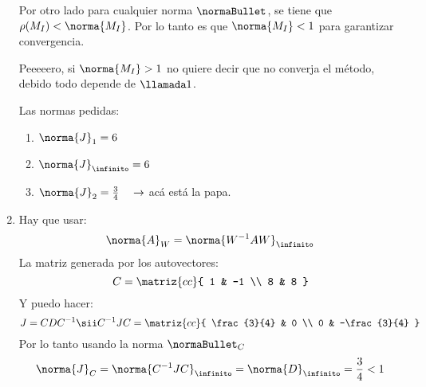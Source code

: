 \begin{enumerate}[label=(\alph*)]
{          Por otro lado para cualquier norma $\normaBullet$, se tiene que $\rho(M_I) < \norma{M_I}$. Por lo tanto
          es \textit{} que $\norma{M_I} < 1$ para garantizar convergencia.

          Peeeeero, si $\norma{M_I} > 1$ no quiere decir que no converja el método, debido todo depende de $\llamada1$.
        }

        Las normas pedidas:
        \begin{enumerate}[label=(\blue{\faIcon{ruler}})]
          \item $\norma{J}_1 = 6$
          \item $\norma{J}_\infinito = 6$
          \item $\norma{J}_2 = \frac{3}{4}\quad \to $ acá está la papa.
        \end{enumerate}

  \item
        Hay que usar:
        $$
          \norma{A}_W = \norma{W^{-1} A W}_\infinito
        $$
        La matriz generada por los autovectores:
        $$
          C =
          \matriz{cc}{
            1 & -1 \\
            8 & 8
          }
        $$
        Y puedo hacer:
        $$
          J = CDC^{-1}
          \sii
          C^{-1} J C =
          \matriz{cc}{
            \frac{3}{4} & 0 \\
            0 & -\frac{3}{4}
          }
        $$
        Por lo tanto usando la norma $\normaBullet_C$
        $$
          \norma{J}_C =
          \norma{C^{-1}JC}_\infinito =
          \norma{D}_\infinito =
          \frac{3}{4} < 1
        $$
\end{enumerate}

\begin{aportes}
  \item {}
\end{aportes}
